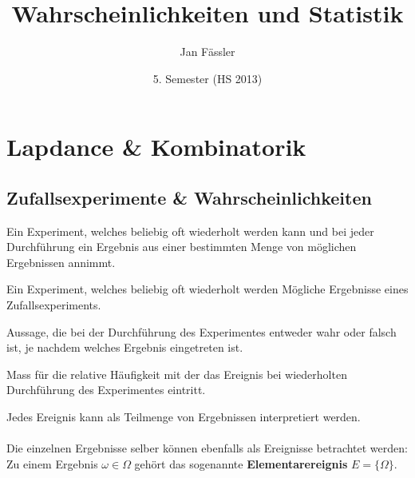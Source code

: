 \documentclass[10pt]{article}
\title{
	\vspace{5cm}
	Wahrscheinlichkeiten und Statistik
}
\author{Jan Fässler}
\date{5. Semester (HS 2013)}
\newtheorem[M]{definition}{Def.}
\newtheorem[M]{satz}{Satz}
\numberwithin{equation}{section}
\begin{document}
\maketitle
\thispagestyle{fancy}
\newpage

\tableofcontents	  	


\newpage
\setcounter{page}{1}


\section{Lapdance \& Kombinatorik}

\subsection{Zufallsexperimente \& Wahrscheinlichkeiten}

\begin{definition}[Zufallsexperiment]
Ein Experiment, welches beliebig oft wiederholt werden kann und bei jeder Durchführung ein Ergebnis aus einer bestimmten Menge von möglichen Ergebnissen annimmt.
\end{definition}

\begin{definition}
Ein Experiment, welches beliebig oft wiederholt werden Mögliche Ergebnisse eines Zufallsexperiments.
\end{definition}

\begin{definition}[Ergebnis]
Aussage, die bei der Durchführung des Experimentes entweder wahr oder falsch ist, je nachdem welches Ergebnis eingetreten ist.
\end{definition}

\begin{definition}[Wahrscheinlichkeit]
Mass für die relative Häufigkeit mit der das Ereignis bei wiederholten Durchführung des Experimentes eintritt.
\end{definition}

Jedes Ereignis kann als Teilmenge von Ergebnissen interpretiert werden. \\
\\
Die einzelnen Ergebnisse selber können ebenfalls als Ereignisse betrachtet werden: \\
Zu einem Ergebnis $\omega \in \Omega$ gehört das sogenannte \textbf{Elementarereignis} $E = \{\Omega\}$.
\end{document}
